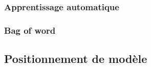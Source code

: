 \subsubsection{Apprentissage automatique}
\subsubsection{Bag of word}

\subsection{Positionnement de modèle}
